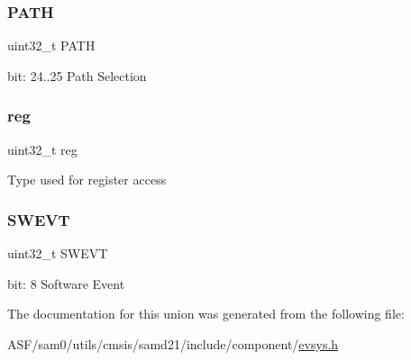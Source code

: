 \subsubsection{\texorpdfstring{PATH}{PATH}}
{\footnotesize\ttfamily uint32\+\_\+t P\+A\+TH}

bit\+: 24..25 Path Selection \mbox{\label{union_e_v_s_y_s___c_h_a_n_n_e_l___type_a6b91636401516a477989a336376d7b40}} 
\subsubsection{\texorpdfstring{reg}{reg}}
{\footnotesize\ttfamily uint32\+\_\+t reg}

Type used for register access \mbox{\label{union_e_v_s_y_s___c_h_a_n_n_e_l___type_aa30e84807f6b1e14d919c27d49c498f9}} 
\subsubsection{\texorpdfstring{SWEVT}{SWEVT}}
{\footnotesize\ttfamily uint32\+\_\+t S\+W\+E\+VT}

bit\+: 8 Software Event 

The documentation for this union was generated from the following file\+:\begin{DoxyCompactItemize}
\item 
A\+S\+F/sam0/utils/cmsis/samd21/include/component/\mbox{\hyperlink{component_2evsys_8h}{evsys.\+h}}\end{DoxyCompactItemize}
